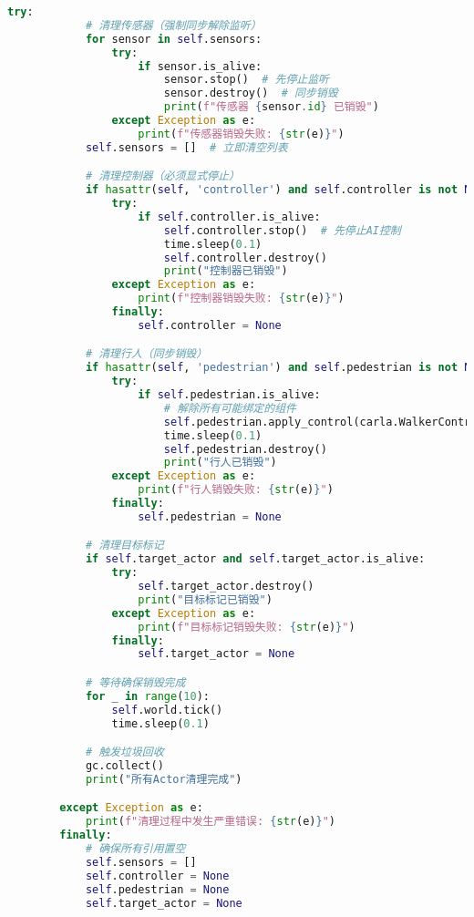 \begin{lstlisting}[language=Python]
        try:
            # 清理传感器（强制同步解除监听）
            for sensor in self.sensors:
                try:
                    if sensor.is_alive:
                        sensor.stop()  # 先停止监听
                        sensor.destroy()  # 同步销毁
                        print(f"传感器 {sensor.id} 已销毁")
                except Exception as e:
                    print(f"传感器销毁失败: {str(e)}")
            self.sensors = []  # 立即清空列表

            # 清理控制器（必须显式停止）
            if hasattr(self, 'controller') and self.controller is not None:
                try:
                    if self.controller.is_alive:
                        self.controller.stop()  # 先停止AI控制
                        time.sleep(0.1)
                        self.controller.destroy()
                        print("控制器已销毁")
                except Exception as e:
                    print(f"控制器销毁失败: {str(e)}")
                finally:
                    self.controller = None

            # 清理行人（同步销毁）
            if hasattr(self, 'pedestrian') and self.pedestrian is not None:
                try:
                    if self.pedestrian.is_alive:
                        # 解除所有可能绑定的组件
                        self.pedestrian.apply_control(carla.WalkerControl())  # 清除控制指令
                        time.sleep(0.1)
                        self.pedestrian.destroy()
                        print("行人已销毁")
                except Exception as e:
                    print(f"行人销毁失败: {str(e)}")
                finally:
                    self.pedestrian = None

            # 清理目标标记
            if self.target_actor and self.target_actor.is_alive:
                try:
                    self.target_actor.destroy()
                    print("目标标记已销毁")
                except Exception as e:
                    print(f"目标标记销毁失败: {str(e)}")
                finally:
                    self.target_actor = None

            # 等待确保销毁完成
            for _ in range(10):
                self.world.tick()
                time.sleep(0.1)

            # 触发垃圾回收
            gc.collect()
            print("所有Actor清理完成")

        except Exception as e:
            print(f"清理过程中发生严重错误: {str(e)}")
        finally:
            # 确保所有引用置空
            self.sensors = []
            self.controller = None
            self.pedestrian = None
            self.target_actor = None


\end{lstlisting}
